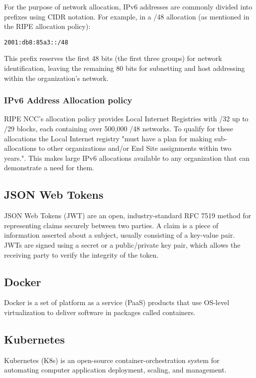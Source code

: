 \documentclass[12pt]{article}
\begin{document}
\noindent For the purpose of network allocation, IPv6 addresses are commonly divided into prefixes using CIDR notation. 
For example, in a /48 allocation (as mentioned in the RIPE allocation policy):
\begin{verbatim}
2001:db8:85a3::/48
\end{verbatim}
This prefix reserves the first 48 bits (the first three groups) for network identification, 
leaving the remaining 80 bits for subnetting and host addressing within the organization's network.
\subsubsection{IPv6 Address Allocation policy}
RIPE NCC's allocation policy provides Local Internet Registries with /32 up to /29 blocks, each containing over 500,000 /48 networks.
To qualify for these allocations the Local Internet registry 
"must have a plan for making sub-allocations to other organizations and/or End Site assignments within two years."\cite{IPv6AddressAllocation}.
This makes large IPv6 allocations available to any organization that can demonstrate a need for them.

\subsection{JSON Web Tokens}
JSON Web Tokens (JWT)\cite{jonesJSONWebToken2015} are an open, industry-standard RFC 7519 method for representing claims securely between two parties.
A claim is a piece of information asserted about a subject, usually consisting of a key-value pair.
JWTs are signed using a secret or a public/private key pair, which allows the receiving party to verify the integrity of the token.

\subsection{Docker}
Docker\cite{DockerAcceleratedContainer2022} is a set of platform as a service (PaaS) products that use OS-level virtualization to deliver software in packages called containers.

\subsection{Kubernetes}
Kubernetes (K8s)\cite{ProductionGradeContainerOrchestration} is an open-source container-orchestration system for automating computer application deployment, scaling, and management.
\end{document}
